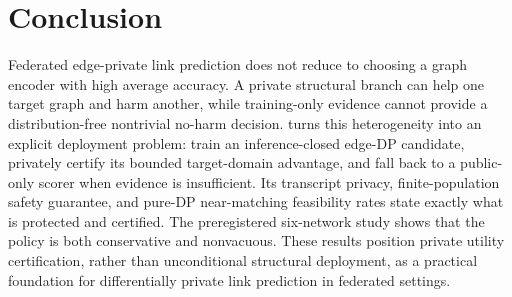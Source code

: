 \section{Conclusion}

Federated edge-private link prediction does not reduce to choosing a graph
encoder with high average accuracy. A private structural branch can help one
target graph and harm another, while training-only evidence cannot provide a
distribution-free nontrivial no-harm decision. \method{} turns this
heterogeneity into an explicit deployment problem: train an inference-closed
edge-DP candidate, privately certify its bounded target-domain advantage, and
fall back to a public-only scorer when evidence is insufficient. Its
transcript privacy, finite-population safety guarantee, and pure-DP
near-matching feasibility rates state exactly what is protected and
certified. The
preregistered six-network study shows that the policy is both conservative
and nonvacuous. These results position private utility certification, rather
than unconditional structural deployment, as a practical foundation for
differentially private link prediction in federated settings.
